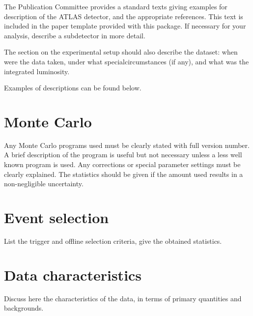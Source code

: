 \documentclass[coverpage]{style/atlasdoc}
\begin{document}
The Publication Committee provides a standard texts giving examples
for description of the ATLAS detector, and the appropriate references.
This text is included in the paper template provided with this package.
If necessary for your analysis, describe a subdetector in more detail.

The section on the experimental setup should also describe the dataset:
when were the data taken, under what specialcircumstances (if any),
and what was the integrated luminosity.

Examples of descriptions can be found below.




\section{Monte Carlo}
\label{sec:MC}

Any Monte Carlo programs used must be clearly stated with full version
number. A brief description of the program is useful but not necessary
unless a less well known program is used.  Any corrections or special
parameter settings must be clearly explained.  The statistics should
be given if the amount used results in a non-negligible uncertainty.


\section{Event selection}
\label{sec:selection}

List the trigger and offline selection criteria, give the obtained
statistics.


\section{Data characteristics}
\label{sec:control}

Discuss here the characteristics of the data, in terms of
primary quantities and backgrounds.


\end{document}

